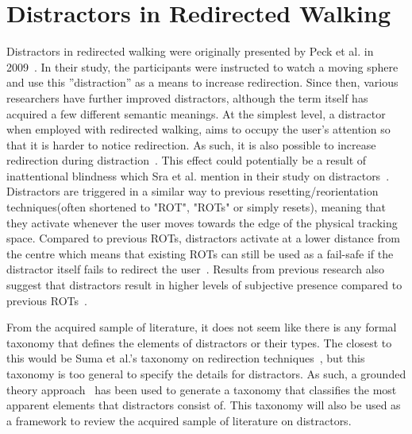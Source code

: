 \section{Distractors in Redirected Walking}\label{sec:relatedDistractors}
Distractors in redirected walking were originally presented by Peck et al. in 2009~\cite{peck2009evaluation}. In their study, the participants were instructed to watch a moving sphere and use this ''distraction'' as a means to increase redirection. Since then, various researchers have further improved distractors, although the term itself has acquired a few different semantic meanings. At the simplest level, a distractor when employed with redirected walking, aims to occupy the user's attention so that it is harder to notice redirection. As such, it is also possible to increase redirection during distraction~\cite{5072212}. This effect could potentially be a result of inattentional blindness which Sra et al. mention in their study on distractors~\cite{sra2018vmotion}. Distractors are triggered in a similar way to previous resetting/reorientation techniques(often shortened to "ROT", "ROTs" or simply resets), meaning that they activate whenever the user moves towards the edge of the physical tracking space. Compared to previous ROTs, distractors activate at a lower distance from the centre which means that existing ROTs can still be used as a fail-safe if the distractor itself fails to redirect the user~\cite{suma2012taxonomy}. Results from previous research also suggest that distractors result in higher levels of subjective presence compared to previous ROTs~\cite{peck2011evaluation}. 

From the acquired sample of literature, it does not seem like there is any formal taxonomy that defines the elements of distractors or their types. The closest to this would be Suma et al.'s taxonomy on redirection techniques~\cite{suma2012taxonomy}, but this taxonomy is too general to specify the details for distractors. As such, a grounded theory approach~\cite{strauss1994grounded} has been used to generate a taxonomy that classifies the most apparent elements that distractors consist of. This taxonomy will also be used as a framework to review the acquired sample of literature on distractors.

